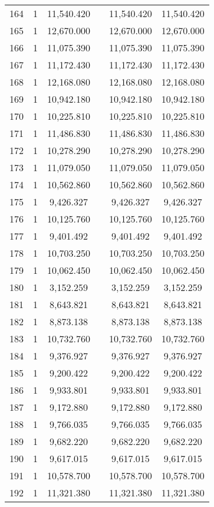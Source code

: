 \begin{table}[!htbp]
\begin{tabular}{@{\extracolsep{5pt}}lccccc}
164 & 1 & 11,540.420 &  & 11,540.420 & 11,540.420 \\ 
165 & 1 & 12,670.000 &  & 12,670.000 & 12,670.000 \\ 
166 & 1 & 11,075.390 &  & 11,075.390 & 11,075.390 \\ 
167 & 1 & 11,172.430 &  & 11,172.430 & 11,172.430 \\ 
168 & 1 & 12,168.080 &  & 12,168.080 & 12,168.080 \\ 
169 & 1 & 10,942.180 &  & 10,942.180 & 10,942.180 \\ 
170 & 1 & 10,225.810 &  & 10,225.810 & 10,225.810 \\ 
171 & 1 & 11,486.830 &  & 11,486.830 & 11,486.830 \\ 
172 & 1 & 10,278.290 &  & 10,278.290 & 10,278.290 \\ 
173 & 1 & 11,079.050 &  & 11,079.050 & 11,079.050 \\ 
174 & 1 & 10,562.860 &  & 10,562.860 & 10,562.860 \\ 
175 & 1 & 9,426.327 &  & 9,426.327 & 9,426.327 \\ 
176 & 1 & 10,125.760 &  & 10,125.760 & 10,125.760 \\ 
177 & 1 & 9,401.492 &  & 9,401.492 & 9,401.492 \\ 
178 & 1 & 10,703.250 &  & 10,703.250 & 10,703.250 \\ 
179 & 1 & 10,062.450 &  & 10,062.450 & 10,062.450 \\ 
180 & 1 & 3,152.259 &  & 3,152.259 & 3,152.259 \\ 
181 & 1 & 8,643.821 &  & 8,643.821 & 8,643.821 \\ 
182 & 1 & 8,873.138 &  & 8,873.138 & 8,873.138 \\ 
183 & 1 & 10,732.760 &  & 10,732.760 & 10,732.760 \\ 
184 & 1 & 9,376.927 &  & 9,376.927 & 9,376.927 \\ 
185 & 1 & 9,200.422 &  & 9,200.422 & 9,200.422 \\ 
186 & 1 & 9,933.801 &  & 9,933.801 & 9,933.801 \\ 
187 & 1 & 9,172.880 &  & 9,172.880 & 9,172.880 \\ 
188 & 1 & 9,766.035 &  & 9,766.035 & 9,766.035 \\ 
189 & 1 & 9,682.220 &  & 9,682.220 & 9,682.220 \\ 
190 & 1 & 9,617.015 &  & 9,617.015 & 9,617.015 \\ 
191 & 1 & 10,578.700 &  & 10,578.700 & 10,578.700 \\ 
192 & 1 & 11,321.380 &  & 11,321.380 & 11,321.380 \\ 

\end{tabular}
\end{table}
